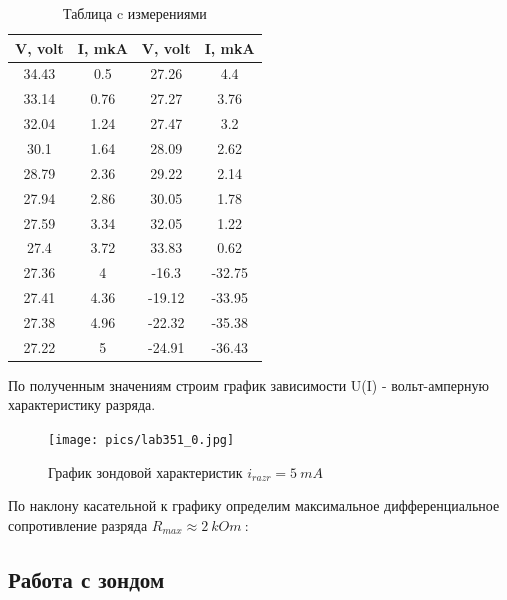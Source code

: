 \begin{table}[!]
    \caption{Таблица c измерениями}
        \begin{center}
            \begin{tabular}{| c | c | c | c |}
            \hline
            \textbf{V, volt} & \textbf{I, mkA} & \textbf{V, volt} & \textbf{I, mkA}\\
            \hline
            34.43 & 0.5 & 27.26 & 4.4\\
            \hline
            33.14 & 0.76 & 27.27 & 3.76\\
            \hline
            32.04 & 1.24 & 27.47 & 3.2\\
            \hline
            30.1 & 1.64 & 28.09 & 2.62\\
            \hline
            28.79 & 2.36 & 29.22 & 2.14\\
            \hline
            27.94 & 2.86 & 30.05 & 1.78\\
            \hline
            27.59 & 3.34 & 32.05 & 1.22\\
            \hline
            27.4 & 3.72 & 33.83 & 0.62\\
            \hline
            27.36 & 4 & -16.3 & -32.75\\
            \hline
            27.41 & 4.36 & -19.12 & -33.95\\
            \hline
            27.38 & 4.96 & -22.32 & -35.38\\
            \hline
            27.22 & 5 & -24.91 & -36.43\\
            \hline
            \end{tabular}
        \end{center}
    \label{A_table}
\end{table}

По полученным значениям строим график зависимости U(I) - вольт-амперную характеристику разряда. 

\begin{figure}[h!]
	\centering
	\texttt{[image: pics/lab351\_0.jpg]}
	\caption{График зондовой характеристик $i_{razr} = 5 \: mA$}
	\label{C}
\end{figure}

По наклону касательной к графику определим максимальное дифференциальное сопротивление разряда $R_{max} \approx 2 \: kOm \:$:

\subsection{Работа с зондом}

